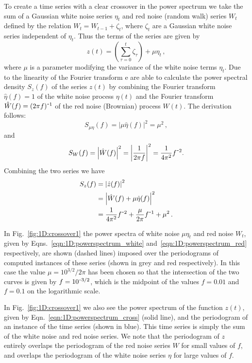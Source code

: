 \documentclass[10pt]{iopart}
\newcommand{\m}{\textup{\texttt{-}}}
\newcommand{\revision}[1]{}
\begin{document}
To create a time series with a clear crossover in the power spectrum we take the sum of a Gaussian white noise series $\eta_t$ and red noise (random walk) series $W_t$ defined by the relation $W_t = W_{t-1} + \zeta_t$, where $\zeta_t$ are a Gaussian white noise series independent of $\eta_t$. Thus the terms of the series are given by
\begin{equation}
	\label{eqn:1D:crossoverfunction}
	z(t) = \left(\sum_{\tau=0}^t \zeta_\tau\right) + \mu\eta_t\,,
\end{equation}
where $\mu$ is a parameter modifying the variance of the white noise terms $\eta_t$. Due to the linearity of the Fourier transform {\revision we are able to calculate the power spectral density $S_z(f)$ of the series $z(t)$ by combining the Fourier transform $\hat{\eta}(f)=1$ of the white noise process $\eta(t)$ and the Fourier transform $\hat{W}(f) = (2\pi f)^{\m1}$ of the red noise (Brownian) process $W(t)$. The derivation follows}:
\begin{equation}
	\label{eqn:1D:powerspectrum_white}
	S_{\mu\eta}(f) = \left| \mu\hat{\eta}(f) \right|^2 = \mu^2\,,
\end{equation}
and
\begin{equation}
	\label{eqn:1D:powerspectrum_red}
	S_{W}(f) = \left| \hat{W}(f) \right|^2 = \left|\frac{1}{2\pi f}\right|^2 = \frac{1}{4\pi^2}f^{\m2}.
\end{equation}
Combining the two series we have
\begin{eqnarray}
		S_z(f) &= \left| \hat{z}(f) \right|^2\nonumber\\
		&= \left| \hat{W}(f) + \mu\hat{\eta}(f) \right|^2\nonumber\\
		\label{eqn:1D:powerspectrum_cross}
		&= \frac{1}{4\pi^2}f^{\m2} + \frac{\mu}{2\pi}f^{\m1} + \mu^2\,.
\end{eqnarray}

In Fig.~\ref{fig:1D:crossover1} the power spectra of white noise $\mu\eta_t$ and red noise $W_t$, given by Eqns.~\ref{eqn:1D:powerspectrum_white} and~\ref{eqn:1D:powerspectrum_red} respectively, are shown (dashed lines) imposed over the periodograms of computed instances of these series (shown in grey and red respectively). In this case the value $\mu = 10^{3/2}/2\pi$ has been chosen so that the intersection of the two curves is given by $f = 10^{\m3/2}$, which is the midpoint of the values $f=0.01$ and $f=0.1$ on the logarithmic scale. 

In Fig.~\ref{fig:1D:crossover1} we also see the power spectrum of the function $z(t)$, given by Eqn.~\ref{eqn:1D:powerspectrum_cross} (solid line), and the periodogram of an instance of the time series (shown in blue). This time series is simply the sum of the white noise and red noise series. We note that the periodogram of $z$ entirely overlaps the periodogram of the red noise series $W$ for small values of $f$, and overlaps the periodogram of the white noise series $\eta$ for large values of $f$. 
\end{document}
